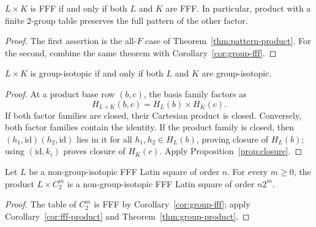 \begin{corollary}\label{cor:fff-product}
$L\times K$ is FFF if and only if both $L$ and $K$ are FFF.  In particular,
product with a finite $2$-group table preserves the full pattern of the other
factor.
\end{corollary}

\begin{proof}
The first assertion is the all-$F$ case of
Theorem~\ref{thm:pattern-product}.  For the second, combine the same theorem
with Corollary~\ref{cor:group-fff}.
\end{proof}

\begin{theorem}\label{thm:group-product}
$L\times K$ is group-isotopic if and only if both $L$ and $K$ are
group-isotopic.
\end{theorem}

\begin{proof}
At a product base row $(b,c)$, the basis family factors as
\[
 H_{L\times K}(b,c)=H_L(b)\times H_K(c).
\]
If both factor families are closed, their Cartesian product is closed.
Conversely, both factor families contain the identity.  If the product family
is closed, then $(h_1,\mathrm{id})(h_2,\mathrm{id})$ lies in it for all
$h_1,h_2\in H_L(b)$, proving closure of $H_L(b)$; using
$(\mathrm{id},k_i)$ proves closure of $H_K(c)$.  Apply
Proposition~\ref{prop:closure}.
\end{proof}

\begin{corollary}\label{cor:inflation}
Let $L$ be a non-group-isotopic FFF Latin square of order $n$.  For every
$m\geq0$, the product $L\times C_2^m$ is a non-group-isotopic FFF Latin
square of order $n2^m$.
\end{corollary}

\begin{proof}
The table of $C_2^m$ is FFF by Corollary~\ref{cor:group-fff}; apply
Corollary~\ref{cor:fff-product} and
Theorem~\ref{thm:group-product}.
\end{proof}
